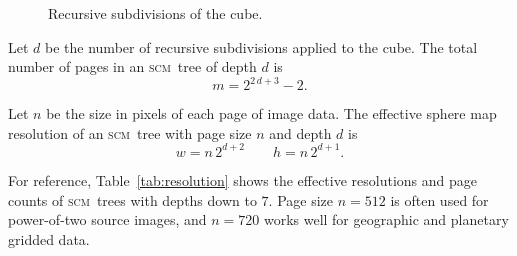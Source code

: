 \documentclass[oneside,10pt]{memoir}
\newcommand{\scm}     {\textsc{scm}}
\begin{document}
\begin{Spacing}{1.1}
\begin{figure}
  \centering
  \hfil
  \caption{Recursive subdivisions of the cube.}
  \label{fig:subdivision}
\end{figure}

Let $d$ be the number of recursive subdivisions applied to the cube. The total number of pages in an \scm\ tree of depth $d$ is
\[m=2^{2\,d+3}-2.\]

Let $n$ be the size in pixels of each page of image data. The effective sphere map resolution of an \scm\ tree with page size $n$ and depth $d$ is
\[w=n\,2^{d+2}\qquad h=n\,2^{d+1}.\]

For reference, Table~\ref{tab:resolution} shows the effective resolutions and page counts of \scm\ trees with depths down to $7$. Page size $n=512$ is often used for power-of-two source images, and $n=720$ works well for geographic and planetary gridded data.


\end{Spacing}
\end{document}
